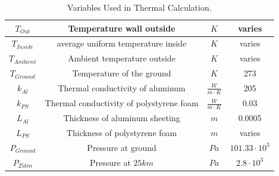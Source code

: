 \begin{table}[H]
{\begin{tabular}{|c|c|c|c|}
        $T_{Out}$ & Temperature wall outside & $K$ & varies \\ \hline
        $T_{Inside}$ & average uniform temperature inside & $K$ & varies \\ \hline
        $T_{Ambient}$ & Ambient temperature outside & $K$ & varies \\ \hline
        $T_{Ground}$ & Temperature of the ground & $K$ & 273 \\ \hline
        $k_{Al}$ & Thermal conductivity of aluminum & $\frac{W}{m\cdot K}$ & 205 \\ \hline
        $k_{PS}$ & Thermal conductivity of polystyrene foam & $\frac{W}{m\cdot K}$ & 0.03 \\ \hline
        $L_{Al}$ & Thickness of aluminum sheeting & $m$ & 0.0005 \\ \hline
        $L_{PS}$ & Thickness of polystyrene foam & $m$ & varies \\ \hline
        $P_{Ground}$ & Pressure at ground & $Pa$ & $101.33 \cdot 10^3$ \\ \hline
        $P_{25km}$ & Pressure at $25 km$ & $Pa$ & $2.8 \cdot 10^3$ \\ \hline
    \end{tabular}}
    \caption{\color{blue}Variables Used in Thermal Calculation.}
    \label{tab:thermal-variables}
\end{table}


